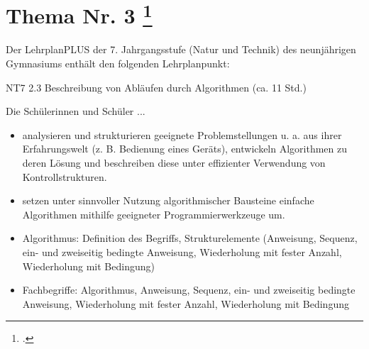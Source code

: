 \documentclass{lehramt-informatik-aufgabe}
\begin{document}

\liAufgabenTitel{}
\section{Thema Nr. 3
\footcite{examen:66118:2021:03}}

Der LehrplanPLUS der 7. Jahrgangsstufe (Natur und Technik) des
neunjährigen Gymnasiums enthält den folgenden Lehrplanpunkt:

\begin{liKasten}
NT7 2.3 Beschreibung von Abläufen durch Algorithmen (ca. 11 Std.)


Die Schülerinnen und Schüler ...

\begin{itemize}
\item analysieren und strukturieren geeignete Problemstellungen u. a.
aus ihrer Erfahrungswelt (z. B. Bedienung eines Geräts), entwickeln
Algorithmen zu deren Lösung und beschreiben diese unter effizienter
Verwendung von Kontrollstrukturen.

\item setzen unter sinnvoller Nutzung algorithmischer Bausteine einfache
Algorithmen mithilfe geeigneter Programmierwerkzeuge um.
\end{itemize}


\begin{itemize}
\item Algorithmus: Definition des Begriffs, Strukturelemente (Anweisung,
Sequenz, ein- und zweiseitig bedingte Anweisung, Wiederholung mit fester
Anzahl, Wiederholung mit Bedingung)

\item Fachbegriffe: Algorithmus, Anweisung, Sequenz, ein- und zweiseitig
bedingte Anweisung, Wiederholung mit fester Anzahl, Wiederholung mit
Bedingung
\end{itemize}
\end{liKasten}
\end{document}

